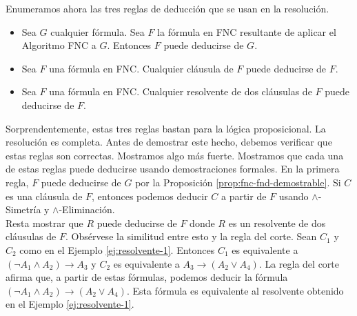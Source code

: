 \message{ !name(main.tex)}\documentclass[12pt,a4paper]{book}
\begin{document}
    Enumeramos ahora las tres reglas de deducción que se usan en la resolución.

    \begin{itemize}
        \item[$\bullet$] Sea $G$ cualquier fórmula. Sea $F$ la fórmula en FNC resultante de aplicar el Algoritmo FNC a $G$.
        Entonces $F$ puede deducirse de $G$.
        \item[$\bullet$] Sea $F$ una fórmula en FNC. Cualquier cláusula de $F$ puede deducirse de $F$.
        \item[$\bullet$] Sea $F$ una fórmula en FNC. Cualquier resolvente de dos cláusulas de $F$ puede deducirse de $F$.
    \end{itemize}

    Sorprendentemente, estas tres reglas bastan para la lógica proposicional. La resolución es completa. Antes de demostrar
    este hecho, debemos verificar que estas reglas son correctas. Mostramos algo más fuerte. Mostramos que cada una de estas
    reglas puede deducirse usando demostraciones formales. En la primera regla, $F$ puede deducirse de $G$ por la
    Proposición \ref{prop:fnc-fnd-demostrable}. Si $C$ es una cláusula de $F$, entonces podemos deducir $C$ a partir de $F$
    usando $\wedge$-Simetría y $\wedge$-Eliminación.\\
    Resta mostrar que $R$ puede deducirse de $F$ donde $R$ es un resolvente de dos cláusulas de $F$. Obsérvese la similitud
    entre esto y la regla del corte. Sean $C_{1}$ y $C_{2}$ como en el Ejemplo \ref{ej:resolvente-1}. Entonces $C_{1}$ es
    equivalente a $(\neg A_{1}\wedge A_{2})\rightarrow A_{3}$ y $C_{2}$ es equivalente a $A_{3}\rightarrow(A_{2}\vee A_{4})$.
    La regla del corte afirma que, a partir de estas fórmulas, podemos deducir la fórmula
    $(\neg A_{1}\wedge A_{2})\rightarrow(A_{2}\vee A_{4})$. Esta fórmula es equivalente al resolvente obtenido en el
    Ejemplo \ref{ej:resolvente-1}.
\end{document}
